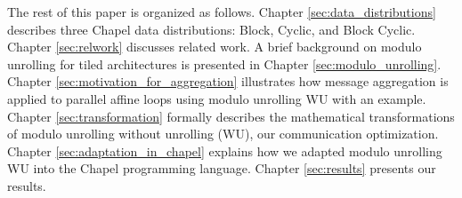 The rest of this paper is organized as follows. Chapter \ref{sec:data_distributions} describes three Chapel data distributions: Block, Cyclic, and Block Cyclic. Chapter \ref{sec:relwork} discusses related work. A brief background on modulo unrolling for tiled architectures \cite{barua1999maps} is presented in Chapter \ref{sec:modulo_unrolling}. Chapter \ref{sec:motivation_for_aggregation} illustrates how message aggregation is applied to parallel affine loops using modulo unrolling WU with an example. Chapter \ref{sec:transformation} formally describes the mathematical transformations of modulo unrolling without unrolling (WU), our communication optimization. Chapter \ref{sec:adaptation_in_chapel} explains how we adapted modulo unrolling WU into the Chapel programming language. Chapter \ref{sec:results} presents our results.